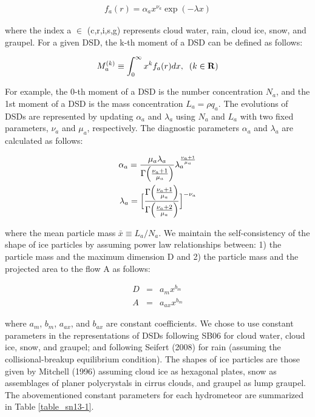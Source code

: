 \begin{eqnarray}
f_{a}(r)=\alpha_{a}x^{\nu_{a}}\exp(-\lambda x)
\label{sn7}
\end{eqnarray}

where the index a $\in$ (c,r,i,s,g) represents cloud water, rain, cloud ice, snow, and graupel. For a given DSD, the k-th moment of a DSD can be defined as follows:

\begin{eqnarray}
M^{(k)}_{a}\equiv \int_{0}^{\infty}x^{k}f_{a}(r)dx,\;\;(k\in {\bf R})
\label{sn8}
\end{eqnarray}

For example, the 0-th moment of a DSD is the number concentration $N_{a}$, and the 1st moment of a DSD is the mass concentration $L_{a} = \rho q_{a}$. The evolutions of DSDs are represented by updating $\alpha_{a}$ and $\lambda_{a}$ using $N_{a}$ and $L_{a}$ with two fixed parameters, $\nu_{a}$ and $\mu_{a}$, respectively. The diagnostic parameters $\alpha_{a}$ and $\lambda_{a}$ are calculated as follows:

\begin{eqnarray}
\alpha_{a}=\frac{\mu_{a}\lambda_{a}}{\Gamma\Bigl(\frac{\nu_{a}+1}{\mu_{a}}\Bigr)}\lambda_{a}^{\frac{\nu_{a}+1}{\mu_{a}}}\\
\label{sn9}
\lambda_{a}=\Bigl[\frac{\Gamma\Bigl(\frac{\nu_{a}+1}{\mu_{a}}\Bigr)}{\Gamma\Bigl(\frac{\nu_{a}+2}{\mu_{a}}\Bigr)}\Bigr]^{-\nu_{a}}\nonumber
\end{eqnarray}

where the mean particle mass $\bar{x}\equiv L_{a}/N_{a}$. We maintain the self-consistency of the shape of ice particles by assuming power law relationships between: 1) the particle mass and the maximum dimension D and 2) the particle mass and the projected area to the flow A as follows:

\begin{eqnarray}
D&=&a_{m}x^{b_{m}}\\
\label{sn10}
A&=&a_{ax}x^{b_{m}}
\label{sn11}
\end{eqnarray}

where $a_{m}$, $b_{m}$, $a_{ax}$, and $b_{ax}$ are constant coefficients. We chose to use constant parameters in the representations of DSDs following SB06 for cloud water, cloud ice, snow, and graupel; and following Seifert (2008) for rain (assuming the collisional-breakup equilibrium condition). The shapes of ice particles are those given by Mitchell (1996) assuming cloud ice as hexagonal plates, snow as assemblages of planer polycrystals in cirrus clouds, and graupel as lump graupel. The abovementioned constant parameters for each hydrometeor are summarized in Table \ref{table_sn13-1}.


